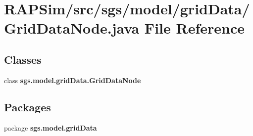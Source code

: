 \section{R\-A\-P\-Sim/src/sgs/model/grid\-Data/\-Grid\-Data\-Node.java File Reference}
\label{_grid_data_node_8java}
\subsection*{Classes}
\begin{DoxyCompactItemize}
\item 
class {\bf sgs.\-model.\-grid\-Data.\-Grid\-Data\-Node}
\end{DoxyCompactItemize}
\subsection*{Packages}
\begin{DoxyCompactItemize}
\item 
package {\bf sgs.\-model.\-grid\-Data}
\end{DoxyCompactItemize}

